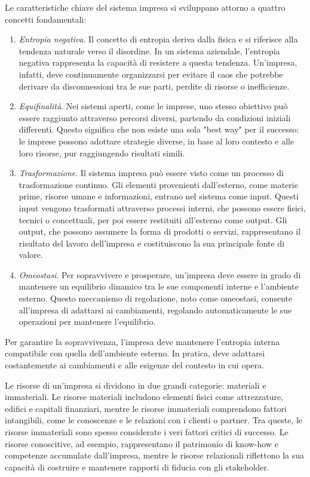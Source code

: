 Le caratteristiche chiave del sistema impresa si sviluppano attorno a quattro concetti fondamentali:
\begin{enumerate}
    \item \textit{Entropia negativa}. Il concetto di entropia deriva dalla fisica e si riferisce alla tendenza naturale verso il disordine. In un sistema aziendale, l’entropia negativa rappresenta la capacità di resistere a questa tendenza. Un’impresa, infatti, deve continuamente organizzarsi per evitare il caos che potrebbe derivare da disconnessioni tra le sue parti, perdite di risorse o inefficienze.
    \item \textit{Equifinalità}. Nei sistemi aperti, come le imprese, uno stesso obiettivo può essere raggiunto attraverso percorsi diversi, partendo da condizioni iniziali differenti. Questo significa che non esiste una sola "best way" per il successo: le imprese possono adottare strategie diverse, in base al loro contesto e alle loro risorse, pur raggiungendo risultati simili. 
    \item \textit{Trasformazione}. Il sistema impresa può essere visto come un processo di trasformazione continuo. Gli elementi provenienti dall’esterno, come materie prime, risorse umane e informazioni, entrano nel sistema come input. Questi input vengono trasformati attraverso processi interni, che possono essere fisici, tecnici o concettuali, per poi essere restituiti all’esterno come output. Gli output, che possono assumere la forma di prodotti o servizi, rappresentano il risultato del lavoro dell'impresa e costituiscono la sua principale fonte di valore.
    \item \textit{Omeostasi}. Per sopravvivere e prosperare, un’impresa deve essere in grado di mantenere un equilibrio dinamico tra le sue componenti interne e l’ambiente esterno. Questo meccanismo di regolazione, noto come omeostasi, consente all’impresa di adattarsi ai cambiamenti, regolando automaticamente le sue operazioni per mantenere l’equilibrio.
\end{enumerate}
Per garantire la sopravvivenza, l’impresa deve mantenere l’entropia interna compatibile con quella dell’ambiente esterno. In pratica, deve adattarsi costantemente ai cambiamenti e alle esigenze del contesto in cui opera.

Le risorse di un'impresa si dividono in due grandi categorie: materiali e immateriali. Le risorse materiali includono elementi fisici come attrezzature, edifici e capitali finanziari, mentre le risorse immateriali comprendono fattori intangibili, come le conoscenze e le relazioni con i clienti o partner. Tra queste, le risorse immateriali sono spesso considerate i veri fattori critici di successo. Le risorse conoscitive, ad esempio, rappresentano il patrimonio di know-how e competenze accumulate dall’impresa, mentre le risorse relazionali riflettono la sua capacità di costruire e mantenere rapporti di fiducia con gli stakeholder.

